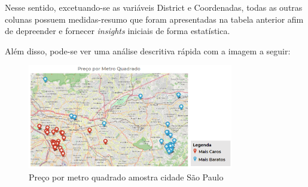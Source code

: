  




    
    

    
    
    

Nesse sentido, excetuando-se as variáveis District e Coordenadas, todas as outras colunas possuem medidas-resumo que foram apresentadas na tabela anterior afim de depreender e fornecer \textit{insights} iniciais de forma estatística.


Além disso, pode-se ver uma análise descritiva rápida com a imagem a seguir:

\begin{figure}[h!]
  \centering
  \includegraphics[width=0.8\textwidth]{relatorios/grupo6/figuras/descritiva.png} 
  \caption{Preço por metro quadrado amostra cidade São Paulo}
  \label{fig:exemplo}
\end{figure}

